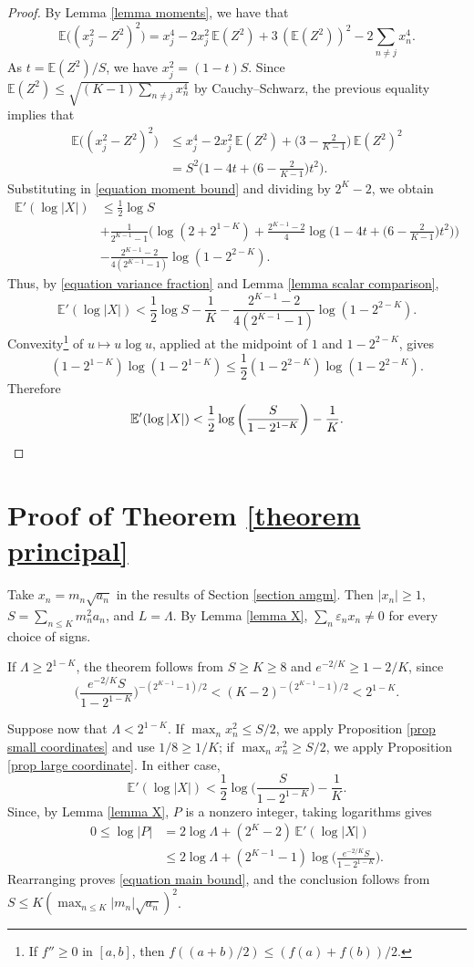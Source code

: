 \documentclass[reqno,12pt]{amsart}
\theoremstyle{remark}
\newcommand{\EE}{\mathbb{E}}
\begin{document}
\begin{proof}
By Lemma \ref{lemma moments}, we have that
$$ \EE\big((x_j^2-Z^2)^2\big) = x_j^4-2x_j^2\,\EE(Z^2)+3\,(\EE(Z^2))^2-2\sum_{n\neq j}x_n^4. $$
As $t = \EE(Z^2)/S$, we have $x_j^2=(1-t)S$. Since $\EE(Z^2)\leq\sqrt{(K-1)\sum_{n\neq j} x_n^4}$ by Cauchy--Schwarz, the previous equality implies that
\begin{align*}
\EE\big((x_j^2-Z^2)^2\big) &\leq x_j^4- 2x_j^2\,\EE(Z^2)+\bigg(3-\frac{2}{K-1}\bigg)\,\EE(Z^2)^2\\
&=S^2\bigg(1-4t+\bigg(6-\frac{2}{K-1}\bigg)t^2\bigg).
\end{align*}
Substituting in \eqref{equation moment bound} and dividing by $2^K-2$, we obtain
\begin{align*}
\EE'(\log|X|) &\leq \frac{1}{2}\log S \\
&+\frac{1}{2^{K-1}-1}\bigg(\log(2+2^{1-K}) +\frac{2^{K-1}-2}{4} \log\bigg(1-4t+\bigg(6-\frac{2}{K-1}\bigg)t^2\bigg)\bigg) \\
&-\frac{2^{K-1}-2}{4(2^{K-1}-1)}\log(1-2^{2-K}).
\end{align*}
Thus, by \eqref{equation variance fraction} and Lemma \ref{lemma scalar comparison},
$$ \EE'(\log|X|)<\frac{1}{2}\log S-\frac{1}{K} -\frac{2^{K-1}-2}{4(2^{K-1}-1)}\log(1-2^{2-K}). $$
Convexity\footnote{If $f''\geq 0$ in $[a,b]$, then $f((a+b)/2) \leq (f(a)+f(b))/2$.} of $u\mapsto u\log u$, applied at the midpoint of $1$ and $1-2^{2-K}$, gives
$$ (1-2^{1-K})\log(1-2^{1-K}) \leq\frac{1}{2}(1-2^{2-K})\log(1-2^{2-K}). $$
Therefore
\[ \EE'(\log|X|) < \frac{1}{2}\log\bigg(\frac{S}{1-2^{1-K}}\bigg)-\frac{1}{K}. \qedhere \]
\end{proof}

\section{Proof of Theorem \ref{theorem principal}}\label{section proof}

Take $x_n=m_n\sqrt{a_n}$ in the results of Section \ref{section amgm}. Then $|x_n|\geq1$, $S=\sum_{n\leq K}m_n^2a_n$, and $L=\Lambda$. By Lemma \ref{lemma X}, $\sum_n \varepsilon_n x_n\neq 0$ for every choice of signs.

If $\Lambda\geq 2^{1-K}$, the theorem follows from $S\geq K\geq8$ and $e^{-2/K}\geq 1-2/K$, since
$$ \bigg(\frac{e^{-2/K}S}{1-2^{1-K}}\bigg)^{-(2^{K-1}-1)/2}< (K-2)^{-(2^{K-1}-1)/2} < 2^{1-K}. $$

Suppose now that $\Lambda<2^{1-K}$. If $\max_nx_n^2\leq S/2$, we apply Proposition \ref{prop small coordinates} and use $1/8\geq1/K$; if $\max_nx_n^2\geq S/2$, we apply Proposition \ref{prop large coordinate}. In either case,
$$ \EE'(\log|X|) < \frac{1}{2}\log\bigg(\frac{S}{1-2^{1-K}}\bigg)-\frac{1}{K}. $$
Since, by Lemma \ref{lemma X}, $P$ is a nonzero integer, taking logarithms gives
\begin{align*}
0\leq\log|P|&=2\log\Lambda + (2^K-2)\,\EE'(\log|X|)\\
&\leq2\log\Lambda + (2^{K-1}-1)\log\bigg(\frac{e^{-2/K}S}{1-2^{1-K}}\bigg).
\end{align*}
Rearranging proves \eqref{equation main bound}, and the conclusion follows from $S\leq K(\max_{n\leq K}|m_n|\sqrt{a_n})^2$.
\end{document}
